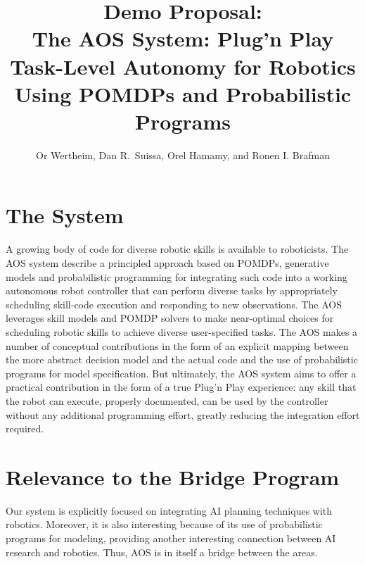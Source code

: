 \documentclass[letterpaper]{article} %
\theoremstyle{definition}
\begin{document}
\title{Demo Proposal:\\
The AOS System: Plug'n Play Task-Level Autonomy for Robotics\\ Using POMDPs and Probabilistic Programs}

\author{Or Wertheim, Dan R.~Suissa, Orel Hamamy, and Ronen I. Brafman}

 

\maketitle

\section{The System}
A growing body of code for diverse robotic skills is available to roboticists. The AOS system describe a principled approach based on POMDPs, generative models and probabilistic programming for integrating such code into a working autonomous robot controller that can perform diverse tasks by appropriately scheduling skill-code execution and responding to new observations.
The AOS leverages skill models and POMDP solvers to make near-optimal choices
for scheduling robotic skills to achieve diverse user-specified tasks. The AOS
makes a number of conceptual contributions in the form of an explicit mapping between the more abstract decision model and the actual code and the use of  probabilistic programs for model specification. But ultimately, the AOS system aims to offer a practical contribution in the form of a true Plug'n Play experience: any skill that the robot can execute, properly documented, can be used by the controller without any additional programming effort, greatly reducing the integration effort required.

\section{Relevance to the Bridge Program}
Our system is explicitly focused on integrating AI planning techniques with robotics. Moreover, it is also interesting because of its use of probabilistic programs for modeling, providing another interesting connection between AI research and robotics.
Thus, AOS is in itself a bridge between the areas.
\end{document}

